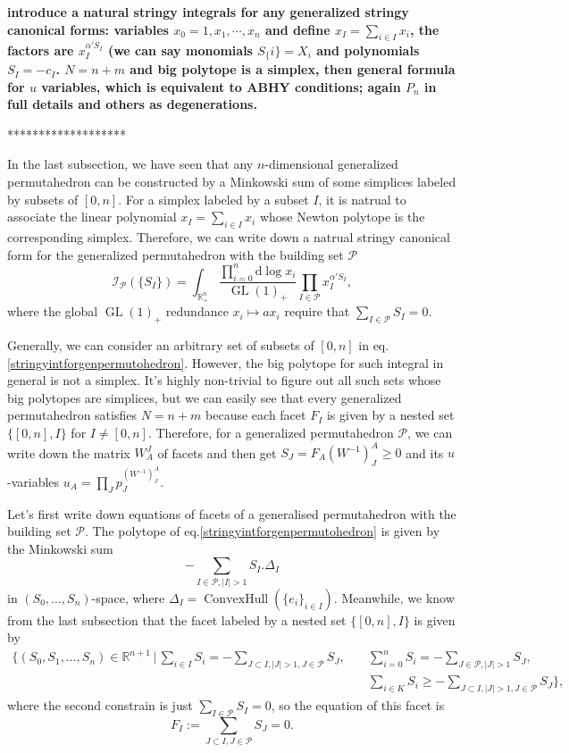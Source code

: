 \documentclass[hidelinks,12pt]{article}
\begin{document}
{\bf introduce a natural stringy integrals for any generalized stringy canonical forms: variables $x_0=1, x_1, \cdots, x_n$ and define $x_I=\sum_{i \in I} x_i$, the factors are $x_I^{\alpha' S_I}$ (we can say monomials $S_\{i\}=X_i$ and polynomials $S_I=-c_I$. $N=n+m$ and big polytope is a simplex, then general formula for $u$ variables, which is equivalent to ABHY conditions; again $P_n$ in full details and others as degenerations.}

*******************

In the last subsection, we have seen that any $n$-dimensional generalized 
permutahedron can be constructed by a Minkowski sum of some simplices labeled by
subsets of $[0,n]$. For a simplex labeled by a subset $I$, 
it is natrual to associate the linear polynomial $x_I=\sum_{i\in I}x_i$ whose Newton polytope is the corresponding simplex. Therefore, we can write down a natrual stringy canonical form for the generalized permutahedron with the building set 
$\mathscr P$
\begin{equation} \label{stringyintforgenpermutohedron}
   \mathcal I_{\mathscr P}(\{S_I\})=\int_{\mathbb R^{n}_+}
	\frac{\prod_{i=0}^n \mathrm{d}\log x_i}
	{\operatorname{GL}(1)_+}\prod_{I\in\mathscr P}x_I^{\alpha' S_I},
\end{equation}
where the global $\operatorname{GL}(1)_+$ redundance $x_i\mapsto a x_i$ require that 
$\sum_{I\in\mathscr P}S_I = 0$. 

Generally, we can consider an arbitrary set of subsets of $[0,n]$ in eq.\eqref{stringyintforgenpermutohedron}. 
However, the big polytope for such integral in general is not a simplex.
It's highly non-trivial to figure out all such sets whose big polytopes are simplices,
but we can easily see that every generalized permutahedron satisfies $N=n+m$
because each facet $F_I$ is given by a nested set $\{[0,n],I\}$ for $I\neq [0,n]$.
Therefore, for a generalized permutahedron $\mathscr P$, we can write down the matrix 
$W^J_A$ of facets and then get $S_J=F_A(W^{-1})^A_J\geq 0$ and 
its $u$-variables $u_A=\prod_J p_J^{(W^{-1})^A_J}$.

Let's first write down equations of facets of a generalised permutahedron
with the building set $\mathscr P$. The polytope of 
eq.\eqref{stringyintforgenpermutohedron} is given by the Minkowski sum
\[
	- \sum_{I\in\mathscr P,|I|>1}S_I.\Delta_I
\]
in $(S_0,\dots,S_n)$-space, where $\Delta_I=\operatorname{ConvexHull}
(\{e_i\}_{i\in I})$. Meanwhile, we know from the last subsection that the facet 
labeled by a nested set $\{[0,n],I\}$ is given by
\begin{align*}
	\biggl\{(S_0,S_1,\dots,S_n)\in \mathbb R^{n+1}\,\bigg |\,
		\sum_{i\in I}S_i = -\sum_{J\subset I,|J|>1,J\in \mathscr P}S_J,
		\quad
		&\sum_{i=0}^nS_i=-\sum_{J\in \mathscr P,|J|>1}S_J,\\
		&\sum_{i\in K}S_i\geq -\sum_{J\subset I,|J|>1,J\in \mathscr P}S_J
	\biggr\},
\end{align*}
where the second constrain is just $\sum_{I\in \mathscr P}S_I=0$, so the equation 
of this facet is 
\begin{equation}\label{GPfacet}
	F_I:=\sum_{J\subset I,J\in\mathscr P}S_J=0.
\end{equation}
\end{document}

